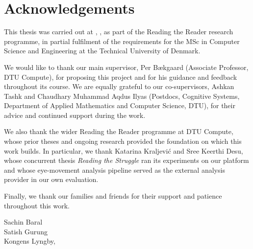 \section*{Acknowledgements}

This thesis was carried out at \department{}, \departmentdescriber{}, as part of the Reading the Reader research programme, in partial fulfilment of the requirements for the MSc in Computer Science and Engineering at the Technical University of Denmark.

We would like to thank our main supervisor, Per B{\ae}kgaard (Associate Professor, DTU Compute), for proposing this project and for his guidance and feedback throughout its course.
We are equally grateful to our co-supervisors, Ashkan Tashk and Chaudhary Muhammad Aqdus Ilyas (Postdocs, Cognitive Systems, Department of Applied Mathematics and Computer Science, DTU), for their advice and continued support during the work.

We also thank the wider Reading the Reader programme at DTU Compute, whose prior theses and ongoing research provided the foundation on which this work builds.
In particular, we thank Katarina Kraljević and Sree Keerthi Desu, whose concurrent thesis \emph{Reading the Struggle} ran its experiments on our platform and whose eye-movement analysis pipeline served as the external analysis provider in our own evaluation.

Finally, we thank our families and friends for their support and patience throughout this work.

\bigskip
\noindent Sachin Baral \\
Satish Gurung \\
Kongens Lyngby, \thedate{}
